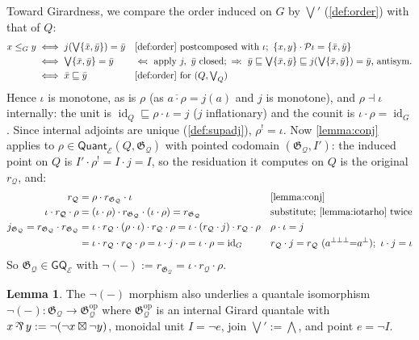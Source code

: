 \documentclass{article}
\theoremstyle{definition}
\newtheorem{lemma}{Lemma}[section]
\DeclareMathOperator{\parr}{\rotatebox[origin=c]{180}{\&}}
\newcommand{\G}{\mathfrak{G}}
\newcommand{\cE}{\mathcal{E}}
\newcommand{\cP}{\mathcal{P}}
\newcommand{\cQ}{\mathcal{Q}}
\newcommand{\cat}[1]{\mathsf{#1}}
\newcommand{\op}{\operatorname{op}}
\newcommand{\id}{\operatorname{id}}
\begin{document}
{Toward Girardness, we compare the order induced on $G$ by $\bigvee'$ (\cref{def:order}) with that of $Q$:
\begin{align*}
x\le_G y &\iff j(\textstyle\bigvee\{\bar x,\bar y\}) = \bar y && \text{\cref{def:order} postcomposed with }\iota;\ \{x,y\}\cdot\cP\iota = \{\bar x,\bar y\}\\
&\iff \textstyle\bigvee\{\bar x,\bar y\} = \bar y && \Leftarrow\!:\text{ apply } j,\ \bar y\text{ closed};\ \Rightarrow\!:\ \bar y\sqsubseteq\textstyle\bigvee\{\bar x,\bar y\}\sqsubseteq j(\textstyle\bigvee\{\bar x,\bar y\})=\bar y\text{, antisym.}\\
&\iff \bar x\sqsubseteq\bar y && \text{\cref{def:order} for } (Q,\textstyle\bigvee_Q)
\end{align*}
Hence $\iota$ is monotone, as is $\rho$ (as $\overline{a\cdot\rho}=j(a)$ and $j$ is monotone), and $\rho\dashv\iota$ internally: the unit is $\id_Q\sqsubseteq\rho\cdot\iota=j$ ($j$ inflationary) and the counit is $\iota\cdot\rho=\id_G$. Since internal adjoints are unique (\cref{def:supadj}), $\rho^!=\iota$. 
Now \cref{lemma:conj} applies to $\rho\in\cat{Quant}_\cE(Q,\G_\cQ)$ with pointed codomain $(\G_\cQ,I')$: the induced point on $Q$ is $I'\cdot\rho^! = I\cdot j = I$, so the residuation it computes on $Q$ is the original $r_\cQ$, and:
\begin{align*}
r_\cQ &= \rho\cdot r_{\G_\cQ}\cdot\iota && \text{\cref{lemma:conj}}\\
\iota\cdot r_\cQ\cdot\rho &= (\iota\cdot\rho)\cdot r_{\G_\cQ}\cdot(\iota\cdot\rho) = r_{\G_\cQ} && \text{substitute; \cref{lemma:iotarho} twice}\\
j_{\G_\cQ} = r_{\G_\cQ}\cdot r_{\G_\cQ} &= \iota\cdot r_\cQ\cdot(\rho\cdot\iota)\cdot r_\cQ\cdot\rho = \iota\cdot(r_\cQ\cdot j)\cdot r_\cQ\cdot\rho && \rho\cdot\iota = j\\
&= \iota\cdot r_\cQ\cdot r_\cQ\cdot\rho = \iota\cdot j\cdot\rho = \iota\cdot\rho = \id_G && r_\cQ\cdot j = r_\cQ\ (a^{\bot\bot\bot}{=}a^\bot);\ \iota\cdot j=\iota
\end{align*}
So $\G_\cQ\in\cat{GQ}_\cE$ with $\neg(-):=r_{\G_\cQ}=\iota\cdot r_\cQ\cdot\rho$.
}


\begin{lemma}
    The $\neg(-)$ morphism also underlies a quantale isomorphism $\neg(-) \colon \G_\cQ\to \G_\cQ^{\op}$ where $\G_\cQ^{\op}$ is an internal Girard quantale with $x\parr y:=\neg(\neg x\boxtimes \neg y)$, monoidal unit $I=\neg e$, join $\bigvee':=\bigwedge$, and point $e=\neg I$.
\end{lemma}
\end{document}
